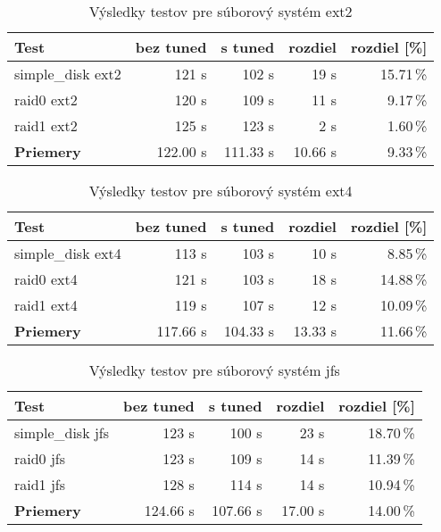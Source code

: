 \begin{table}[H]
\begin{center}
\begin{tabular}{|l|r|r|r|r|}
    \hline
    \textbf{Test} & \textbf{bez tuned} & \textbf{s tuned} & \textbf{rozdiel} & \textbf{rozdiel [\%]} \\ \hline
    simple\_disk ext2 & 121 s & 102 s & 19 s & 15.71\,\% \\
    \hline
    raid0 ext2 & 120 s & 109 s & 11 s & 9.17\,\% \\
    \hline
    raid1 ext2 & 125 s & 123 s & 2 s & 1.60\,\% \\
    \hline
    \textbf{Priemery} & 122.00 s & 111.33 s & 10.66 s & 9.33\,\% \\
    \hline
\end{tabular}
\caption{Výsledky testov pre súborový systém ext2}
\label{tab:results-ext2}
\end{center}
\end{table}

\begin{table}[H]
\begin{center}
\begin{tabular}{|l|r|r|r|r|}
    \hline
    \textbf{Test} & \textbf{bez tuned} & \textbf{s tuned} & \textbf{rozdiel} & \textbf{rozdiel [\%]} \\ \hline
    simple\_disk ext4 & 113 s & 103 s & 10 s & 8.85\,\% \\
    \hline
    raid0 ext4 & 121 s & 103 s & 18 s & 14.88\,\% \\
    \hline
    raid1 ext4 & 119 s & 107 s & 12 s & 10.09\,\% \\
    \hline
    \textbf{Priemery} & 117.66 s & 104.33 s & 13.33 s & 11.66\,\% \\
    \hline
\end{tabular}
\caption{Výsledky testov pre súborový systém ext4}
\label{tab:results-ext4}
\end{center}
\end{table}

\begin{table}[H]
\begin{center}
\begin{tabular}{|l|r|r|r|r|}
    \hline
    \textbf{Test} & \textbf{bez tuned} & \textbf{s tuned} & \textbf{rozdiel} & \textbf{rozdiel [\%]} \\ \hline
    simple\_disk jfs & 123 s & 100 s & 23 s & 18.70\,\% \\
    \hline
    raid0 jfs & 123 s & 109 s & 14 s & 11.39\,\% \\
    \hline
    raid1 jfs & 128 s & 114 s & 14 s & 10.94\,\% \\
    \hline
    \textbf{Priemery} & 124.66 s & 107.66 s & 17.00 s & 14.00\,\% \\
    \hline
\end{tabular}
\caption{Výsledky testov pre súborový systém jfs}
\label{tab:results-jfs}
\end{center}
\end{table}

